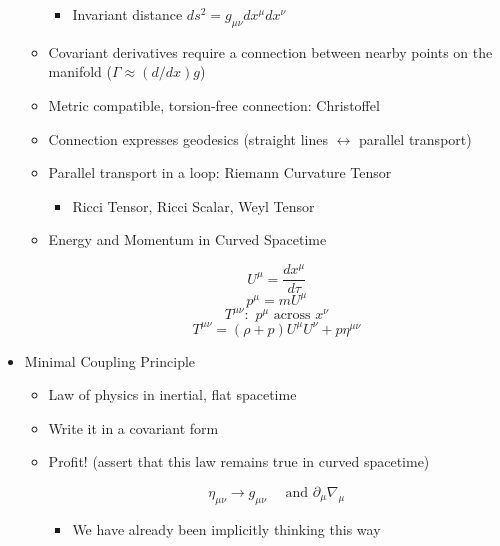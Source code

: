 \begin{itemize}
\begin{itemize}
\begin{itemize}
          \item Invariant distance $ds^2=g_{\mu\nu}dx^{\mu}dx^{\nu}$

        \end{itemize}

      \item Covariant derivatives require a connection between nearby points on the manifold ($\Gamma \approx (d/dx)g$)

      \item Metric compatible, torsion-free connection: Christoffel

      \item Connection expresses geodesics (straight lines $\leftrightarrow$ parallel transport)

      \item Parallel transport in a loop: Riemann Curvature Tensor

        \begin{itemize}

          \item Ricci Tensor, Ricci Scalar, Weyl Tensor

        \end{itemize}

      \item Energy and Momentum in Curved Spacetime

        $$U^{\mu}=\frac{dx^{\mu}}{d\tau}$$
        $$p^{\mu}=mU^{\mu}$$
        $$T^{\mu\nu}:\,\, p^{\mu}\text{ across }x^{\nu}$$
        $$T^{\mu\nu}=(\rho+p)U^{\mu}U^{\nu}+p\eta^{\mu\nu}$$

    \end{itemize}

  \item Minimal Coupling Principle

    \begin{itemize}

      \item Law of physics in inertial, flat spacetime

      \item Write it in a covariant form

      \item Profit! (assert that this law remains true in curved spacetime)

        $$\eta_{\mu\nu}\to g_{\mu\nu}\quad\text{ and }\partial_{\mu}\nabla_{\mu}$$

        \begin{itemize}

          \item We have already been implicitly thinking this way


\end{itemize}
\end{itemize}
\end{itemize}
